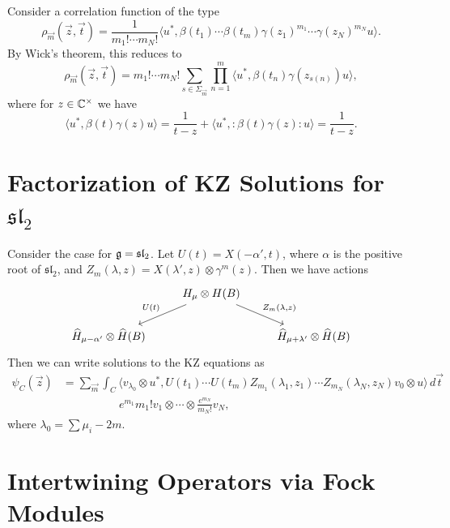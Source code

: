 \begin{remark}
  Consider a correlation function of the
  type
  \[
    \rho_{\vec{m}}(\vec{z}, \vec{t})
    = \frac{1}{m_1! \cdots m_N!}
    \langle u^*, \beta(t_1) \cdots \beta(t_m)
    \gamma(z_1)^{m_1} \cdots \gamma(z_N)^{m_N} u \rangle.
  \]
  \pagebreak
  By Wick's theorem, this reduces to
  \[
    \rho_{\vec{m}}(\vec{z}, \vec{t})
    = m_1! \cdots m_N!
    \sum_{s \in \Sigma_{\vec{m}}}
    \prod_{n = 1}^m \langle u^*, \beta(t_n) \gamma(z_{s(n)}) u \rangle,
  \]
  where for $z \in \mathbb{C}^\times$ we have
  \[
    \langle u^*, \beta(t) \gamma(z) u \rangle
    = \frac{1}{t - z} +
    \langle u^*, {:} \beta(t) \gamma(z) {:} u \rangle
    = \frac{1}{t - z}.
  \]
\end{remark}

\section{Factorization of KZ Solutions for \texorpdfstring{$\mathfrak{sl}_2$}{sl2}}

\begin{remark}
  Consider the case for $\mathfrak{g} = \mathfrak{sl}_2$.
  Let $U(t) = X(-\alpha', t)$, where
  $\alpha$ is the positive root of
  $\mathfrak{sl}_2$, and
  $Z_m(\lambda, z) = X(\lambda', z)
    \otimes \gamma^m(z)$.
  Then we have actions
  \[
    \begin{tikzcd}
      & H_\mu \otimes H(B) \ar[dl, "U(t)", swap] \ar[dr, "{Z_m(\lambda, z)}"] \\
      \widehat{H}_{\mu - \alpha'} \otimes \widehat{H}(B)
      & & \widehat{H}_{\mu + \lambda'} \otimes \widehat{H}(B)
    \end{tikzcd}
  \]
  Then we can write solutions to the KZ
  equations as
  \begin{align*}
    \psi_C(\vec{z})
    &= \sum_{\vec{m}} \int_C \langle
    v_{\lambda_0} \otimes u^*, U(t_1) \cdots U(t_m) Z_{m_1}(\lambda_1, z_1)
    \cdots Z_{m_N}(\lambda_N, z_N) v_0 \otimes u \rangle\, d\vec{t} \\
    & \quad \quad \quad \quad \quad {e^{m_1}}{m_1!} v_1 \otimes \cdots \otimes \frac{e^{m_N}}{m_N!} v_N,
  \end{align*}
  where $\lambda_0 = \sum \mu_i - 2m$.
\end{remark}

\section{Intertwining Operators via Fock Modules}

